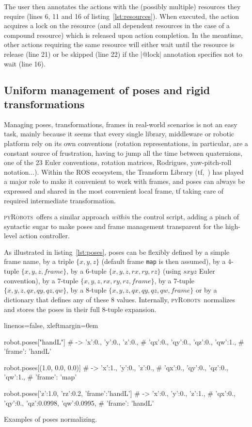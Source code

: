 \documentclass[a4paper, 10pt, conference]{ieeeconf}      %
\newcommand{\pyRobots}{\textsc{pyRobots}\ }
\begin{document}
The user then annotates the actions with the (possibly multiple) resources they
require (lines 6, 11 and 16 of listing~\ref{lst:resources}). When executed, the
action acquires a lock on the resource (and all dependent resources in the case
of a compound resource) which is released upon action completion. In the
meantime, other actions requiring the same resource will either wait until the
resource is release (line 21) or be skipped (line 22) if the \python|@lock|
annotation specifies not to wait (line 16).


\subsection{Uniform management of poses and rigid transformations}

Managing poses, transformations, frames in real-world scenarios is not an easy
task, mainly because it seems that every single library, middleware or robotic
platform rely on its own conventions (rotation representations, in particular,
are a constant source of frustration, having to jump all the time between
quaternions, one of the 23 Euler conventions, rotation matrices, Rodrigues,
yaw-pitch-roll notation...). Within the ROS ecosystem, the Transform Library
(tf,~\cite{foote2013tf}) has played a major role to make it convenient to work
with frames, and poses can always be expressed and shared in the most convenient
local frame, tf taking care of required intermediate transformation.

\pyRobots offers a similar approach \emph{within} the control script, adding a
pinch of syntactic sugar to make poses and frame management transparent for the
high-level action controller.

As illustrated in listing~\ref{lst:poses}, poses can be flexibly defined by a
simple frame name, by a triple $\{x, y, z\}$ (default frame {\tt map} is then
assumed), by a 4-tuple $\{x, y, z, frame\}$, by a 6-tuple $\{x, y, z, rx, ry,
rz\}$ (using $sxyz$ Euler convention), by a 7-tuple $\{x, y, z, rx, ry, rz,
frame\}$, by a 7-tuple $\{x, y, z, qx, qy, qz, qw\}$, by a 8-tuple $\{x, y, z,
qx, qy, qz, qw, frame\}$ or by a dictionary that defines any of these 8 values.
Internally, \pyRobots normalizes and stores the poses in their full 8-tuple
expansion.

\begin{listing}[H]
    \begin{pythoncode*}{linenos=false, xleftmargin=0em}

    robot.poses["handL"]
    # -> {'x':0., 'y':0., 'z':0., 
    #    'qx':0., 'qy':0., 'qz':0., 'qw':1., 
    #    'frame': 'handL'}

    robot.poses[(1.0, 0.0, 0.0)]
    # -> {'x':1., 'y':0., 'z':0., 
    #    'qx':0., 'qy':0., 'qz':0., 'qw':1., 
    #    'frame': 'map'}

    robot.poses[{'z':1.0, 'rz':0.2, 'frame':'handL'}]
    # -> {'x':0., 'y':0., 'z':1., 
    #    'qx':0., 'qy':0., 'qz':0.0998, 'qw':0.0995, 
    #    'frame': 'handL'}

\end{pythoncode*}
\caption{Examples of poses normalizing.}
\label{lst:poses}
\end{listing}
\end{document}
